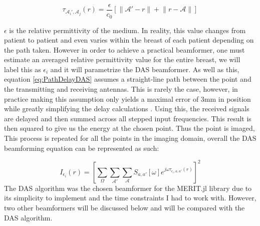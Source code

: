 \begingroup
\large
\begin{equation}
    \tau_{\mathcal{A}_i', \mathcal{A}_j}(r) = \frac{\epsilon}{c_0} \left [\lVert \mathcal{A}' - r \rVert + \lVert r - \mathcal{A}\rVert\right ]
    \label{eq:PathDelayDAS}
\end{equation}
\endgroup


$\epsilon$ is the relative permittivity of the medium. In reality, this value changes from patient to patient and even
varies within the breast of each patient depending on the path taken. However in order to achieve a practical beamformer, one must estimate an
averaged relative permittivity value for the entire breast, we will label this as $\epsilon_i$ and it will parametrize
the DAS beamformer. As well as this, equation \ref{eq:PathDelayDAS} assumes a straight-line path between the point and
the transmitting and receiving antennas. This is rarely the case, however, in practice making this assumption
only yields a maximal error of 3mm in position while greatly simplifying the delay calculations
\cite{oloughlinParameterSearchAlgorithms2017}. Using this, the received signals are delayed and then summed across all
stepped input frequencies. This result is then squared to give us the energy at the chosen point. Thus the point is
imaged, This process is repeated for all the points in the imaging domain, overall the DAS beamforming equation can be
represented as such:

\begingroup
\large
\begin{equation}
    I_{\epsilon_i}(r) = \left [\sum_{\Omega}\sum_{\mathcal{A}'}\sum_{\mathcal{A}} S_{a, a'}[\omega]e^{j\omega \tau_{\epsilon_i, a, a'}(r)}\right ]^2
    \label{eq:DASBeamformer}
\end{equation}
\endgroup
The DAS algorithm was the chosen beamformer for the MERIT.jl library due to its simplicity to implement and the time
constraints I had to work with. However, two other beamformers will be discussed below and will be compared with the DAS
algorithm.

